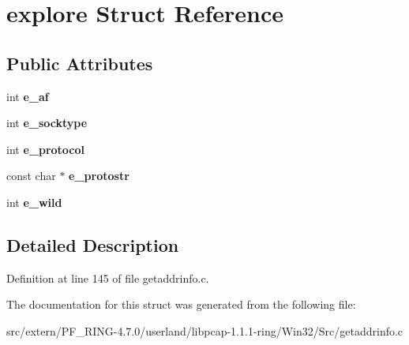 \hypertarget{structexplore}{
\section{explore Struct Reference}
\label{structexplore}
}
\subsection*{Public Attributes}
\begin{DoxyCompactItemize}
\item 
\hypertarget{structexplore_a7eb8b4695ac7d60799ff459d23d23f40}{
int {\bfseries e\_\-af}}
\label{structexplore_a7eb8b4695ac7d60799ff459d23d23f40}

\item 
\hypertarget{structexplore_a311ad886d9e7359815da374561b25db5}{
int {\bfseries e\_\-socktype}}
\label{structexplore_a311ad886d9e7359815da374561b25db5}

\item 
\hypertarget{structexplore_af83036275177c16ca1097db896419d5a}{
int {\bfseries e\_\-protocol}}
\label{structexplore_af83036275177c16ca1097db896419d5a}

\item 
\hypertarget{structexplore_a07b9ca1c416c57f4a232e002c7991135}{
const char $\ast$ {\bfseries e\_\-protostr}}
\label{structexplore_a07b9ca1c416c57f4a232e002c7991135}

\item 
\hypertarget{structexplore_aae2a1571a6726b59269a2b26bda062f1}{
int {\bfseries e\_\-wild}}
\label{structexplore_aae2a1571a6726b59269a2b26bda062f1}

\end{DoxyCompactItemize}


\subsection{Detailed Description}


Definition at line 145 of file getaddrinfo.c.



The documentation for this struct was generated from the following file:\begin{DoxyCompactItemize}
\item 
src/extern/PF\_\-RING-\/4.7.0/userland/libpcap-\/1.1.1-\/ring/Win32/Src/getaddrinfo.c\end{DoxyCompactItemize}
